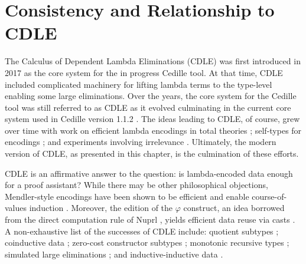 \chapter{Consistency and Relationship to CDLE}




\newcommand{\cBool}{\textnormal{Bool}}
\newcommand{\ctt}{\textnormal{tt}}
\newcommand{\cff}{\textnormal{ff}}

\newcommand{\cId}{\textnormal{Id}}
\newcommand{\crefl}{\textnormal{refl}}
\newcommand{\ctheta}{\textnormal{theta}}
\newcommand{\csubst}{\textnormal{subst}}
\newcommand{\cdelta}{\textnormal{delta}}
\newcommand{\cirrel}{\textnormal{irrel}}

The Calculus of Dependent Lambda Eliminations (CDLE) was first introduced in 2017 \cite{stump2017_cdle} as the core system for the in progress Cedille tool.
At that time, CDLE included complicated machinery for lifting lambda terms to the type-level enabling some large eliminations.
Over the years, the core system for the Cedille tool was still referred to as CDLE as it evolved culminating in the current core system used in Cedille version 1.1.2 \cite{stump2021_cedillecore}.
The ideas leading to CDLE, of course, grew over time with work on efficient lambda encodings in total theories \cite{stump2016_encodings}; self-types for encodings \cite{fu2014self}; and experiments involving irrelevance \cite{sjoberg2012irrelevance,sjoberg2011equality}.
Ultimately, the modern version of CDLE, as presented in this chapter, is the culmination of these efforts.

CDLE is an affirmative answer to the question: is lambda-encoded data enough for a proof assistant?
While there may be other philosophical objections, Mendler-style encodings have been shown to be efficient and enable course-of-values induction \cite{firsov2018_mendler,firsov2018course}.
Moreover, the edition of the $\varphi$ construct, an idea borrowed from the direct computation rule of Nuprl \cite{allen2000}, yields efficient data reuse via casts \cite{diehl2018_generic_reuse}.
A non-exhaustive list of the successes of CDLE include: quotient subtypes \cite{marmaduke2020quotients}; coinductive data \cite{jenkins2020efficient}; zero-cost constructor subtypes \cite{marmaduke2020_constructor_subtyping}; monotonic recursive types \cite{jenkins2021monotone_recursive_types}; simulated large eliminations \cite{jenkins2021_large_elim}; and inductive-inductive data \cite{marmaduke2023_indind}.

